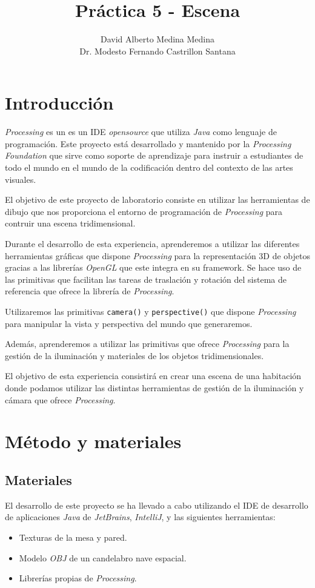 \documentclass[10pt,a4paper]{report}
\author{David Alberto Medina Medina
	\\
	Dr. Modesto Fernando Castrillon Santana}
\title{Práctica 5 - Escena}
\begin{document}
	\maketitle
	\tableofcontents
	
	\chapter{Introducción}
	\textit{Processing} es un es un IDE \textit{opensource} que utiliza \textit{Java} como lenguaje de programación. Este proyecto está desarrollado y mantenido por la \textit{Processing Foundation} que sirve como soporte de aprendizaje para instruir a estudiantes de todo el mundo en el mundo de la codificación dentro del contexto de las artes visuales.
	
	El objetivo de este proyecto de laboratorio consiste en utilizar las herramientas de dibujo que nos proporciona el entorno de programación de \textit{Processing} para contruir una escena tridimensional.
	
	Durante el desarrollo de esta experiencia, aprenderemos a utilizar las diferentes herramientas gráficas que dispone \textit{Processing} para la representación 3D de objetos gracias a las librerías \textit{OpenGL} que este integra en su framework. Se hace uso de las primitivas que facilitan las tareas de traslación y rotación del sistema de referencia que ofrece la librería de \textit{Processing}.
	
	Utilizaremos las primitivas \texttt{camera()} y \texttt{perspective()} que dispone \textit{Processing} para manipular la vista y perspectiva del mundo que generaremos.
	
	Además, aprenderemos a utilizar las primitivas que ofrece \textit{Processing} para la gestión de la iluminación y materiales de los objetos tridimensionales.
	
	El objetivo de esta experiencia consistirá en crear una escena de una habitación donde podamos utilizar las distintas herramientas de gestión de la iluminación y cámara que ofrece \textit{Processing}.
	
	\chapter{Método y materiales}
	\section{Materiales}
	El desarrollo de este proyecto se ha llevado a cabo utilizando el IDE de desarrollo de aplicaciones \textit{Java} de \textit{JetBrains}, \textit{IntelliJ}, y las siguientes herramientas:
	\begin{itemize}
		\item Texturas de la mesa y pared.
		\item Modelo \textit{OBJ} de un candelabro nave espacial.
		\item Librerías propias de \textit{Processing}.
	\end{itemize}
	
\end{document}
